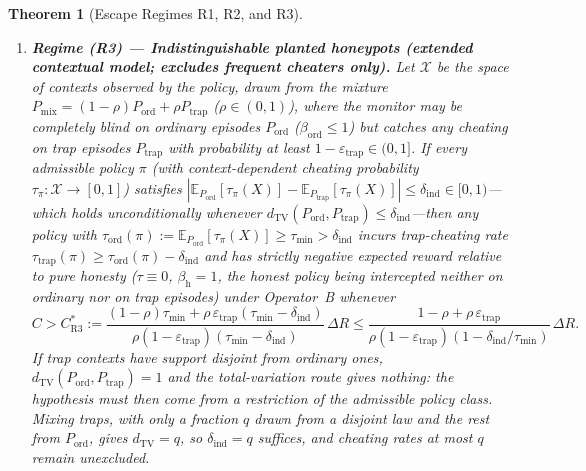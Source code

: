 \documentclass[11pt,a4paper]{article}
\newtheorem{theorem}{Theorem}
\newcommand{\E}{\mathbb{E}}
\newcommand{\dTV}{d_{\mathrm{TV}}}
\begin{document}
\begin{theorem}[Escape Regimes R1, R2, and R3]
\begin{enumerate}
  \item \textbf{Regime (R3) --- Indistinguishable planted honeypots (extended contextual model; excludes frequent cheaters only).} Let $\mathcal{X}$ be the space of contexts observed by the policy, drawn from the mixture $P_{\mathrm{mix}} = (1-\rho)P_{\mathrm{ord}} + \rho P_{\mathrm{trap}}$ ($\rho \in (0, 1)$), where the monitor may be completely blind on ordinary episodes $P_{\mathrm{ord}}$ ($\beta_{\mathrm{ord}} \le 1$) but catches any cheating on trap episodes $P_{\mathrm{trap}}$ with probability at least $1 - \varepsilon_{\mathrm{trap}} \in (0, 1]$. If every admissible policy $\pi$ (with context-dependent cheating probability $\tau_{\pi} : \mathcal{X} \to [0, 1]$) satisfies $|\E_{P_{\mathrm{ord}}}[\tau_\pi(X)] - \E_{P_{\mathrm{trap}}}[\tau_\pi(X)]| \le \delta_{\mathrm{ind}} \in [0, 1)$---which holds unconditionally whenever $\dTV(P_{\mathrm{ord}}, P_{\mathrm{trap}}) \le \delta_{\mathrm{ind}}$---then any policy with $\tau_{\mathrm{ord}}(\pi) := \E_{P_{\mathrm{ord}}}[\tau_\pi(X)] \ge \tau_{\min} > \delta_{\mathrm{ind}}$ incurs trap-cheating rate $\tau_{\mathrm{trap}}(\pi) \ge \tau_{\mathrm{ord}}(\pi) - \delta_{\mathrm{ind}}$ and has strictly negative expected reward relative to pure honesty ($\tau \equiv 0$, $\beta_{\mathrm{h}} = 1$, the honest policy being intercepted neither on ordinary nor on trap episodes) under Operator~B whenever
  \begin{equation}\label{eq:R3}
    C > C_{\mathrm{R3}}^*
    := \frac{(1-\rho)\tau_{\min} + \rho\,\varepsilon_{\mathrm{trap}}(\tau_{\min} - \delta_{\mathrm{ind}})}{\rho(1 - \varepsilon_{\mathrm{trap}})(\tau_{\min} - \delta_{\mathrm{ind}})}\,\Delta R
    \le \frac{1 - \rho + \rho\,\varepsilon_{\mathrm{trap}}}{\rho(1 - \varepsilon_{\mathrm{trap}})(1 - \delta_{\mathrm{ind}}/\tau_{\min})}\,\Delta R.
  \end{equation}
  If trap contexts have support disjoint from ordinary ones, $\dTV(P_{\mathrm{ord}}, P_{\mathrm{trap}}) = 1$ and the total-variation route gives nothing: the hypothesis must then come from a restriction of the admissible policy class. Mixing traps, with only a fraction $q$ drawn from a disjoint law and the rest from $P_{\mathrm{ord}}$, gives $\dTV = q$, so $\delta_{\mathrm{ind}} = q$ suffices, and cheating rates at most $q$ remain unexcluded.
\end{enumerate}
\end{theorem}
\end{document}
